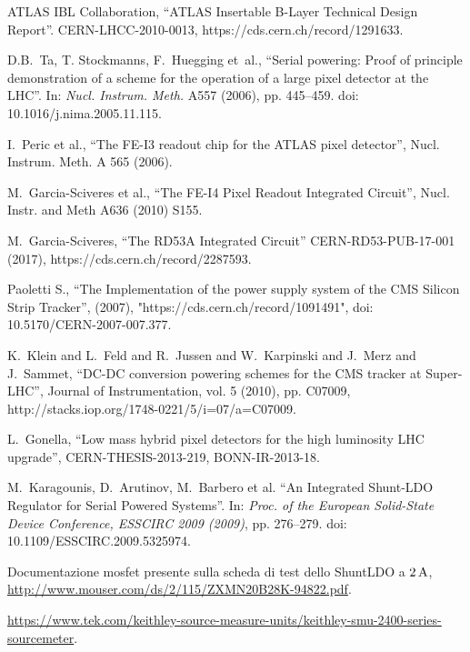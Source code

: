 \begin{thebibliography}{1}
 ATLAS IBL Collaboration, ``ATLAS Insertable B-Layer
  Technical Design Report''. CERN-LHCC-2010-0013, https://cds.cern.ch/record/1291633.

  
 D.B.~Ta, T. Stockmanns, F.~Huegging et~al., ``Serial powering: Proof of principle demonstration of a scheme for the operation of a large pixel detector at the LHC''. In: \textit{Nucl. Instrum. Meth.} A557 (2006), pp. 445--459. doi: 10.1016/j.nima.2005.11.115.

 I.~Peric et al., ``The FE-I3 readout chip for the ATLAS pixel detector'', Nucl. Instrum. Meth. A 565 (2006).

 M.~Garcia-Sciveres et al., ``The FE-I4 Pixel Readout
  Integrated Circuit'', Nucl. Instr. and Meth A636 (2010) S155.

 M.~Garcia-Sciveres, ``The RD53A Integrated Circuit''
  CERN-RD53-PUB-17-001 (2017), https://cds.cern.ch/record/2287593.

 Paoletti S., ``The Implementation of the power supply system of the CMS Silicon Strip Tracker'', (2007), "https://cds.cern.ch/record/1091491", doi: 10.5170/CERN-2007-007.377.

% 
K.~Klein and L.~Feld and R.~Jussen and W.~Karpinski and J.~Merz and J.~Sammet, ``DC-DC conversion powering schemes for the CMS tracker at Super-LHC'', Journal of Instrumentation, vol. 5 (2010), pp. C07009, http://stacks.iop.org/1748-0221/5/i=07/a=C07009.

 L.~Gonella, ``Low mass hybrid pixel detectors for the high luminosity LHC upgrade'', CERN-THESIS-2013-219, BONN-IR-2013-18.


 M.~Karagounis, D.~Arutinov, M.~Barbero et al. ``An Integrated Shunt-LDO Regulator for Serial Powered Systems''. In: \textit{Proc. of the European Solid-State Device Conference,
ESSCIRC 2009 (2009)}, pp. 276–279. doi: 10.1109/ESSCIRC.2009.5325974.

 Documentazione mosfet presente sulla scheda di test dello ShuntLDO a $2\rm \, A$,  
  \url{http://www.mouser.com/ds/2/115/ZXMN20B28K-94822.pdf}.

 \url{https://www.tek.com/keithley-source-measure-units/keithley-smu-2400-series-sourcemeter}.


\end{thebibliography}
